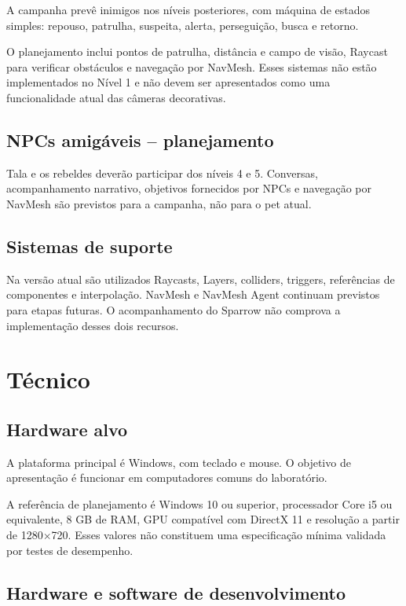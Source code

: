 \documentclass[12pt,a4paper]{article}
\begin{document}
A campanha prevê inimigos nos níveis posteriores, com máquina de
estados simples: repouso, patrulha, suspeita, alerta, perseguição,
busca e retorno.

O planejamento inclui pontos de patrulha, distância e campo de
visão, Raycast para verificar obstáculos e navegação por NavMesh.
Esses sistemas não estão implementados no Nível 1 e não devem ser
apresentados como uma funcionalidade atual das câmeras decorativas.

\subsection{NPCs amigáveis -- planejamento}

Tala e os rebeldes deverão participar dos níveis 4 e 5. Conversas,
acompanhamento narrativo, objetivos fornecidos por NPCs e navegação
por NavMesh são previstos para a campanha, não para o pet atual.

\subsection{Sistemas de suporte}

Na versão atual são utilizados Raycasts, Layers, colliders, triggers,
referências de componentes e interpolação. NavMesh e NavMesh Agent
continuam previstos para etapas futuras. O acompanhamento do
Sparrow não comprova a implementação desses dois recursos.



\section{Técnico}

\subsection{Hardware alvo}

A plataforma principal é Windows, com teclado e mouse. O objetivo
de apresentação é funcionar em computadores comuns do laboratório.

A referência de planejamento é Windows 10 ou superior, processador
Core i5 ou equivalente, 8 GB de RAM, GPU compatível com DirectX 11
e resolução a partir de 1280$\times$720. Esses valores não constituem
uma especificação mínima validada por testes de desempenho.

\subsection{Hardware e software de desenvolvimento}
\end{document}
